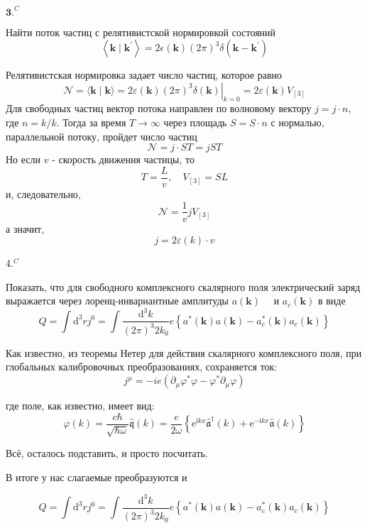 \documentclass[a4paper,12pt]{article} %
\begin{document}
\begin{ttask}$\mathbf{3 .}^{C}$ 

Найти поток частиц с релятивистской нормировкой состояний
$$
\left\langle\boldsymbol{k} \mid \boldsymbol{k}^{\prime}\right\rangle=
2 \epsilon(\boldsymbol{k})(2 \pi)^{3} \delta\left(\boldsymbol{k}-\boldsymbol{k}^{\prime}\right)
$$



Релятивистская нормировка задает число частиц, которое равно
$$
\mathcal{N}=\langle\boldsymbol{k} \mid \boldsymbol{k}\rangle=\left.2 \varepsilon(\boldsymbol{k})(2 \pi)^{3} \delta(\boldsymbol{k})\right|_{k=0}=2 \varepsilon(\boldsymbol{k}) V_{[3]}
$$
Для свободных частиц вектор потока направлен по волновому вектору $j=j \cdot n,$ где $n=k / k .$ Тогда за время $T \rightarrow \infty$ через площадь $S=S \cdot n$ с нормалью, параллельной потоку, пройдет число частиц
$$
\mathcal{N}=j \cdot S T=j S T
$$
Но если $v$ - скорость движения частицы, то
$$
T=\frac{L}{v}, \quad V_{[3]}=S L
$$
и, следовательно,
$$
\mathcal{N}=\frac{1}{v} j V_{[3]}
$$
а значит,
$$
j=2 \varepsilon(k) \cdot v
$$




\end{ttask}



\begin{ttask} 4.$^{C}$ 
	
Показать, что для свободного комплексного скалярного поля электрический заряд выражается через 
лоренц-инвариантные амплитуды $a(\boldsymbol{k}) \quad$ и $a_{c}(\boldsymbol{k})$ в виде
$$
Q=
\int \mathrm{d}^{3} r j^{0}=
\int \frac{\mathrm{d}^{3} k}{(2 \pi)^{3} 2 k_{0}} e\left\{a^{*}(\boldsymbol{k}) a(\boldsymbol{k})-a_{c}^{*}(\boldsymbol{k}) a_{c}(\boldsymbol{k})\right\}
$$


Как известно, из теоремы Нетер для действия скалярного 
комплексного поля, при глобальных калибровочных преобразованиях, сохраняется ток:
\[ 
j^\mu 
=
-i e (\partial_\mu \varphi^{*}\varphi -\varphi^{*}\partial_\mu \varphi)
 \]


где поле, как известно, имеет вид:
$$
\varphi(k)=\frac{c \hbar}{\sqrt{\hbar \omega}} \hat{\mathfrak{q}}(k)=\frac{e}{2 \omega}\left\{\mathrm{e}^{\mathrm{i} k x} \hat{\mathfrak{a}}^{\dagger}(k)+\mathrm{e}^{-\mathrm{i} k x} \hat{\mathfrak{a}}(k)\right\}
$$


Всё, осталось подставить, и просто посчитать.


В итоге у нас слагаемые преобразуются и 

$$
Q=
\int \mathrm{d}^{3} r j^{0}=
\int \frac{\mathrm{d}^{3} k}{(2 \pi)^{3} 2 k_{0}} e\left\{a^{*}(\boldsymbol{k}) a(\boldsymbol{k})-a_{c}^{*}(\boldsymbol{k}) a_{c}(\boldsymbol{k})\right\}
$$









\end{ttask}
\end{document}
